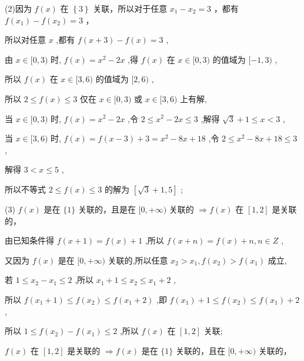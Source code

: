 \documentclass[10pt]{article}
\newcommand*\circled[1]{\tikz[baseline=(char.base)]{\node[shape=circle,draw,inner sep=1.5pt] (char) {\small #1};}}
\begin{document}
(2)因为 \(f\left( x\right)\) 在 \(\left\{  3\right\}\) 关联，所以对于任意 \({x}_{1} - {x}_{2} = 3\) ，都有 \(f\left( {x}_{1}\right)  - f\left( {x}_{2}\right)  = 3\) ，

所以对任意 \(x\) ,都有 \(f\left( {x + 3}\right)  - f\left( x\right)  = 3\) ,

由 \(x \in  \lbrack 0,3)\) 时, \(f\left( x\right)  = {x}^{2} - {2x}\) ,得 \(f\left( x\right)\) 在 \(x \in  \lbrack 0,3)\) 的值域为 \(\lbrack  - 1,3)\) ,

所以 \(f\left( x\right)\) 在 \(x \in  \lbrack 3,6)\) 的值域为 \(\lbrack 2,6)\) ,

所以 \(2 \leq  f\left( x\right)  \leq  3\) 仅在 \(x \in  \lbrack 0,3)\) 或 \(x \in  \lbrack 3,6)\) 上有解,

当 \(x \in  \lbrack 0,3)\) 时, \(f\left( x\right)  = {x}^{2} - {2x}\) ,令 \(2 \leq  {x}^{2} - {2x} \leq  3\) ,解得 \(\sqrt{3} + 1 \leq  x < 3\) ,

当 \(x \in  \lbrack 3,6)\) 时, \(f\left( x\right)  = f\left( {x - 3}\right)  + 3 = {x}^{2} - {8x} + {18}\) ,令 \(2 \leq  {x}^{2} - {8x} + {18} \leq  3\) ,

解得 \(3 < x \leq  5\) ,

所以不等式 \(2 \leq  f\left( x\right)  \leq  3\) 的解为 \(\left\lbrack  {\sqrt{3} + 1,5}\right\rbrack\) ;

(3) \circled{1}  \(f\left( x\right)\) 是在 \(\{ 1\}\) 关联的，且是在 \(\lbrack 0, + \infty )\) 关联的 \(\Rightarrow  f\left( x\right)\) 在 \(\left\lbrack  {1,2}\right\rbrack\) 是关联的，

由已知条件得 \(f\left( {x + 1}\right)  = f\left( x\right)  + 1\) ,所以 \(f\left( {x + n}\right)  = f\left( x\right)  + n,n \in  Z\) ,

又因为 \(f\left( x\right)\) 是在 \(\lbrack 0, + \infty )\) 关联的,所以任意 \({x}_{2} > {x}_{1},f\left( {x}_{2}\right)  > f\left( {x}_{1}\right)\) 成立,

若 \(1 \leq  {x}_{2} - {x}_{1} \leq  2\) ,所以 \({x}_{1} + 1 \leq  {x}_{2} \leq  {x}_{1} + 2\) ,

所以 \(f\left( {{x}_{1} + 1}\right)  \leq  f\left( {x}_{2}\right)  \leq  f\left( {{x}_{1} + 2}\right)\) ,即 \(f\left( {x}_{1}\right)  + 1 \leq  f\left( {x}_{2}\right)  \leq  f\left( {x}_{1}\right)  + 2\) ,

所以 \(1 \leq  f\left( {x}_{2}\right)  - f\left( {x}_{1}\right)  \leq  2\) ,所以 \(f\left( x\right)\) 在 \(\left\lbrack  {1,2}\right\rbrack\) 关联;

 \circled{2}  \(f\left( x\right)\) 在 \(\left\lbrack  {1,2}\right\rbrack\) 是关联的 \(\Rightarrow  f\left( x\right)\) 是在 \(\{ 1\}\) 关联的，且在 \(\lbrack 0, + \infty )\) 关联的，
\end{document}
